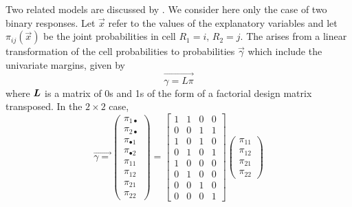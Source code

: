Two related models are discussed by \citet[Section 6.5]{McCullaghNelder:89}.
We consider here only the case of two binary responses. Let $\vec{x}$
refer to the values of the explanatory variables and let $\pi _{ij}\left(
\vec{x}\right) $ be the joint probabilities in cell $R_1=i,\,R_2=j$. The
 arises from a linear transformation of the
cell probabilities to probabilities $\vec{\gamma }$ which include the
univariate margins, given by
\begin{equation}\label{eq:gamma1}
\vec{\gamma =L\pi }
\end{equation}
where $\bm{L}$ is a matrix of 0s and 1s of the form of a factorial
design matrix transposed. In the $2\times 2$ case,
\begin{equation}\label{eq:gamma2}
\vec{\gamma =}\left(
\begin{array}{c}
\pi _{1\bullet } \\
\pi _{2\bullet } \\
\pi _{\bullet 1} \\
\pi _{\bullet 2} \\
\pi _{11} \\
\pi _{12} \\
\pi _{21} \\
\pi _{22}
\end{array}
\right) =\left[
\begin{array}{cccc}
1 & 1 & 0 & 0 \\
0 & 0 & 1 & 1 \\
1 & 0 & 1 & 0 \\
0 & 1 & 0 & 1 \\
1 & 0 & 0 & 0 \\
0 & 1 & 0 & 0 \\
0 & 0 & 1 & 0 \\
0 & 0 & 0 & 1
\end{array}
\right] \left(
\begin{array}{c}
\pi _{11} \\
\pi _{12} \\
\pi _{21} \\
\pi _{22}
\end{array}
\right)
\end{equation}

